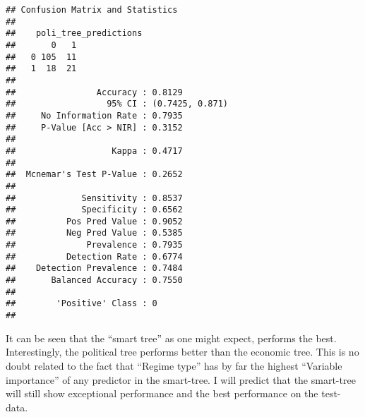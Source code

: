 \documentclass[
]{article}
\newenvironment{Shaded}{\begin{snugshade}}{\end{snugshade}}
\newcommand{\AttributeTok}[1]{\textcolor[rgb]{0.77,0.63,0.00}{#1}}
\newcommand{\CommentTok}[1]{\textcolor[rgb]{0.56,0.35,0.01}{\textit{#1}}}
\newcommand{\FunctionTok}[1]{\textcolor[rgb]{0.00,0.00,0.00}{#1}}
\newcommand{\NormalTok}[1]{#1}
\newcommand{\OtherTok}[1]{\textcolor[rgb]{0.56,0.35,0.01}{#1}}
\newcommand{\SpecialCharTok}[1]{\textcolor[rgb]{0.00,0.00,0.00}{#1}}
\newcommand{\StringTok}[1]{\textcolor[rgb]{0.31,0.60,0.02}{#1}}
\begin{document}
\begin{verbatim}
## Confusion Matrix and Statistics
## 
##    poli_tree_predictions
##       0   1
##   0 105  11
##   1  18  21
##                                          
##                Accuracy : 0.8129         
##                  95% CI : (0.7425, 0.871)
##     No Information Rate : 0.7935         
##     P-Value [Acc > NIR] : 0.3152         
##                                          
##                   Kappa : 0.4717         
##                                          
##  Mcnemar's Test P-Value : 0.2652         
##                                          
##             Sensitivity : 0.8537         
##             Specificity : 0.6562         
##          Pos Pred Value : 0.9052         
##          Neg Pred Value : 0.5385         
##              Prevalence : 0.7935         
##          Detection Rate : 0.6774         
##    Detection Prevalence : 0.7484         
##       Balanced Accuracy : 0.7550         
##                                          
##        'Positive' Class : 0              
## 
\end{verbatim}

\begin{Shaded}
\end{Shaded}

It can be seen that the ``smart tree'' as one might expect, performs the
best. Interestingly, the political tree performs better than the
economic tree. This is no doubt related to the fact that ``Regime type''
has by far the highest ``Variable importance'' of any predictor in the
smart-tree. I will predict that the smart-tree will still show
exceptional performance and the best performance on the test-data.

\begin{Shaded}
\end{Shaded}
\end{document}
